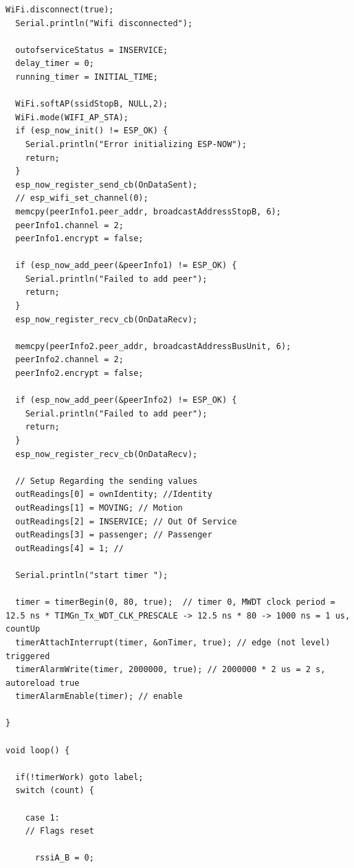 \documentclass[12pt]{article} %
\begin{document}
\begin{lstlisting}[style=myArduino]
  WiFi.disconnect(true);
  Serial.println("Wifi disconnected");

  outofserviceStatus = INSERVICE;
  delay_timer = 0;
  running_timer = INITIAL_TIME;

  WiFi.softAP(ssidStopB, NULL,2);
  WiFi.mode(WIFI_AP_STA);
  if (esp_now_init() != ESP_OK) {
    Serial.println("Error initializing ESP-NOW");
    return;
  }
  esp_now_register_send_cb(OnDataSent);
  // esp_wifi_set_channel(0);
  memcpy(peerInfo1.peer_addr, broadcastAddressStopB, 6);
  peerInfo1.channel = 2;  
  peerInfo1.encrypt = false;
  
  if (esp_now_add_peer(&peerInfo1) != ESP_OK) {
    Serial.println("Failed to add peer");
    return;
  }
  esp_now_register_recv_cb(OnDataRecv);

  memcpy(peerInfo2.peer_addr, broadcastAddressBusUnit, 6);
  peerInfo2.channel = 2;  
  peerInfo2.encrypt = false;
  
  if (esp_now_add_peer(&peerInfo2) != ESP_OK) {
    Serial.println("Failed to add peer");
    return;
  }
  esp_now_register_recv_cb(OnDataRecv);

  // Setup Regarding the sending values
  outReadings[0] = ownIdentity; //Identity
  outReadings[1] = MOVING; // Motion
  outReadings[2] = INSERVICE; // Out Of Service 
  outReadings[3] = passenger; // Passenger
  outReadings[4] = 1; // 

  Serial.println("start timer ");

  timer = timerBegin(0, 80, true);  // timer 0, MWDT clock period = 12.5 ns * TIMGn_Tx_WDT_CLK_PRESCALE -> 12.5 ns * 80 -> 1000 ns = 1 us, countUp
  timerAttachInterrupt(timer, &onTimer, true); // edge (not level) triggered 
  timerAlarmWrite(timer, 2000000, true); // 2000000 * 2 us = 2 s, autoreload true
  timerAlarmEnable(timer); // enable

}

void loop() {
  
  if(!timerWork) goto label;
  switch (count) {

    case 1:
    // Flags reset
    
      rssiA_B = 0;


\end{lstlisting}
\end{document}
